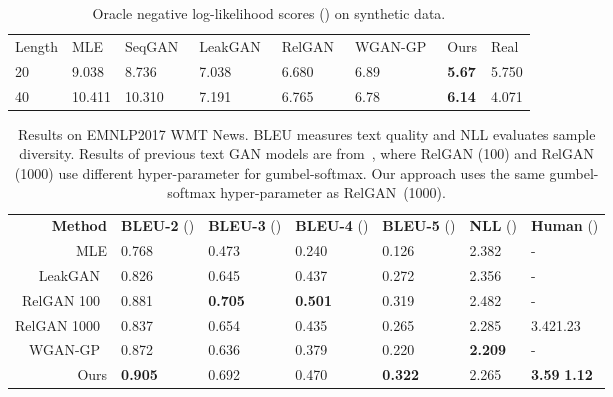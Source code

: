 \documentclass{article}
\newcommand{\0}{\bm{0}}
\begin{document}
\begin{table}[t]
\renewcommand{\arraystretch}{0.9} 
\centering
\small
\begin{tabular}{l | llllll | l}
\toprule
Length & MLE  & SeqGAN~\cite{yu2017seqgan} & LeakGAN~\cite{guo2018long} & RelGAN~\cite{nie2018relgan}  & WGAN-GP~\citep{wgangp} & Ours & Real  \\
\cmidrule{1-8}
20   & 9.038 & 8.736   & 7.038   & 6.680 & 6.89  & \textbf{5.67} & 5.750  \\
40   & 10.411 & 10.310  & 7.191   & 6.765 & 6.78 & \textbf{6.14} & 4.071\\
\bottomrule
\end{tabular}
\vspace{1pt}
\caption{Oracle negative log-likelihood scores () on synthetic data. 
} \label{tab:txtgan_oracle}
\vspace{-10pt}
\end{table}





\begin{table}[t]
\renewcommand{\arraystretch}{0.9} 
\setlength{\tabcolsep}{4.9pt} 
\small
\centering
\begin{tabular}{@{}r llll | l | l@{}}
\toprule
{\bf Method}        & {\bf BLEU-2} () & {\bf BLEU-3} () & {\bf BLEU-4} () & {\bf BLEU-5} () & {\bf NLL} () & {\bf Human} ()\\
\cmidrule{1-7}
MLE           & 0.768  & 0.473  & 0.240   & 0.126  & 2.382  & - \\
LeakGAN~\cite{guo2018long}       & 0.826  & 0.645  & 0.437  & 0.272  & 2.356  & - \\
RelGAN 100~\cite{nie2018relgan}  & 0.881  & \textbf{0.705}  & \textbf{0.501}  & 0.319  & 2.482  & - \\
RelGAN 1000~\cite{nie2018relgan} & 0.837  & 0.654  & 0.435  & 0.265  & 2.285  & 3.421.23 \\
WGAN-GP~\cite{wgangp}       & 0.872  & 0.636  & 0.379  & 0.220   & \textbf{2.209}  & - \\\cmidrule{1-7}
Ours          & \textbf{0.905}  & 0.692  & 0.470   & \textbf{0.322}  & 2.265 & {\bf 3.59}  {\bf 1.12} \\
\bottomrule
\end{tabular}
\vspace{1pt}
\caption{
Results on EMNLP2017 WMT News. BLEU measures text quality and NLL evaluates sample diversity. Results of previous text GAN models are from~\cite{nie2018relgan}, where RelGAN (100) and RelGAN (1000) use different hyper-parameter for gumbel-softmax. Our approach uses the same gumbel-softmax hyper-parameter as RelGAN~(1000). 
}
\label{tab:text-emnlp}
\vspace{-10pt}
\end{table}
\end{document}
